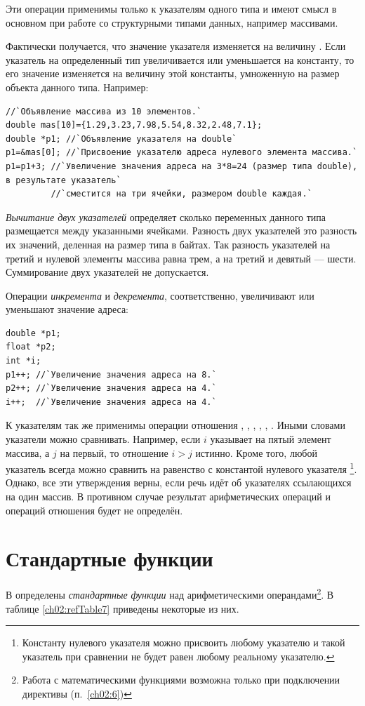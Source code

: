 Эти операции применимы только к указателям одного типа и имеют смысл в основном при работе со структурными типами
данных, например массивами.

Фактически получается, что значение указателя изменяется на величину . Если указатель на
определенный тип увеличивается или уменьшается на константу, то его значение изменяется на величину этой константы,
умноженную на размер объекта данного типа. Например:
\begin{lstlisting}
//`Объявление массива из 10 элементов.`
double mas[10]={1.29,3.23,7.98,5.54,8.32,2.48,7.1}; 
double *p1; //`Объявление указателя на double`
p1=&mas[0]; //`Присвоение указателю адреса нулевого элемента массива.`
p1=p1+3; //`Увеличение значения адреса на 3*8=24 (размер типа double), в результате указатель`
         //`сместится на три ячейки, размером double каждая.`
\end{lstlisting}

\emph{Вычитание двух указателей} определяет сколько переменных данного типа размещается между указанными
ячейками. Разность двух указателей это разность их значений, деленная на размер типа в байтах. Так разность указателей
на третий и нулевой элементы массива равна трем, а на третий и девятый --- шести. Суммирование двух указателей не
допускается.

Операции \emph{инкремента} и \emph{декремента}, соответственно, увеличивают или уменьшают
значение адреса:
\begin{lstlisting}
double *p1;
float *p2; 
int *i; 
p1++; //`Увеличение значения адреса на 8.`
p2++; //`Увеличение значения адреса на 4.`
i++;  //`Увеличение значения адреса на 4.`
\end{lstlisting}

К указателям так же применимы {операции отношения} \Sys{==}, \Sys{!=},
\Sys{{<}}, \Sys{{>}}, \Sys{{<}=},
\Sys{{>}=}. Иными словами указатели можно сравнивать. Например, если $i$
указывает на пятый элемент массива, а $j$ на первый, то отношение $i>j$
истинно. Кроме того, любой указатель всегда можно сравнить на равенство с константой нулевого указателя
\footnote{Константу нулевого указателя можно присвоить любому указателю и такой указатель при сравнении не будет
равен любому реальному указателю.}. Однако, все эти утверждения верны, если речь идёт об указателях ссылающихся на один
массив. В противном случае результат арифметических операций и операций отношения будет не определён.

\section[Стандартные функции]{Стандартные функции}\label{ch02:7}
В  определены \emph{стандартные}
\emph{функции} над арифметическими операндами\footnote{Работа с математическими функциями
возможна только при подключении директивы  (п.~\ref{ch02:6})}. В таблице \ref{ch02:refTable7} приведены
некоторые из них.

